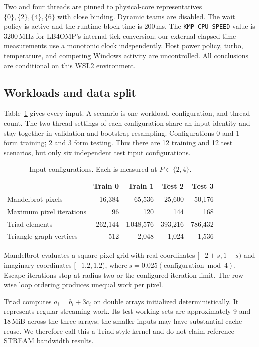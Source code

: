 \documentclass[10pt,letterpaper]{article}
\newcommand{\code}[1]{\texttt{#1}}
\begin{document}
Two and four threads are pinned to physical-core representatives
$\{0\},\{2\},\{4\},\{6\}$ with close binding. Dynamic teams are disabled.
The wait policy is active and the runtime block time is 200\,ms. The
\code{KMP\_CPU\_SPEED} value is 3200\,MHz for LB4OMP's internal tick conversion;
our external elapsed-time measurements use a monotonic clock independently.
Host power policy, turbo, temperature, and competing Windows activity are
uncontrolled. All conclusions are conditional on this WSL2 environment.

\subsection{Workloads and data split}

Table~\ref{tab:inputs} gives every input. A scenario is one workload,
configuration, and thread count. The two thread settings of each configuration
share an input identity and stay together in validation and bootstrap
resampling. Configurations 0 and 1 form training; 2 and 3 form testing. Thus
there are 12 training and 12 test scenarios, but only six independent test
input configurations.

\begin{table}[ht]
\centering\small
\caption{Input configurations. Each is measured at $P\in\{2,4\}$.}
\label{tab:inputs}
\begin{tabular}{lrrrr}
\hline
 & Train 0 & Train 1 & Test 2 & Test 3\\
\hline
Mandelbrot pixels & 16,384 & 65,536 & 25,600 & 50,176\\
Maximum pixel iterations & 96 & 120 & 144 & 168\\
Triad elements & 262,144 & 1,048,576 & 393,216 & 786,432\\
Triangle graph vertices & 512 & 2,048 & 1,024 & 1,536\\
\hline
\end{tabular}
\end{table}

Mandelbrot evaluates a square pixel grid with real coordinates
$[-2+s,1+s)$ and imaginary coordinates $[-1.2,1.2)$, where
$s=0.025(\mathrm{configuration}\bmod4)$. Escape iterations stop at radius two
or the configured iteration limit. The row-wise loop ordering produces
unequal work per pixel.

Triad computes $a_i=b_i+3c_i$ on double arrays initialized deterministically.
It represents regular streaming work. Its test working sets are approximately
9 and 18\,MiB across the three arrays; the smaller inputs may have substantial
cache reuse. We therefore call this a Triad-style kernel and do not claim
reference STREAM bandwidth results.
\end{document}
